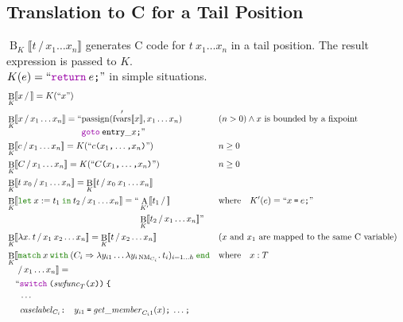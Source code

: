 \documentclass[a4paper,fleqn]{article}
\newcommand{\kwlet}{\mbox{\color{mygreen}\ttfamily let}}
\newcommand{\kwin}{\mbox{\color{mygreen}\ttfamily in}}
\newcommand{\kwmatch}{\mbox{\color{mygreen}\ttfamily match}}
\newcommand{\kwwith}{\mbox{\color{mygreen}\ttfamily with}}
\newcommand{\kwend}{\mbox{\color{mygreen}\ttfamily end}}
\newcommand{\lam}[2]{\lambda #1.\:#2}
\newcommand{\lamB}[1]{\lambda #1.\:}
\newcommand{\letin}[3]{\kwlet\:#1:=#2\:\kwin\:#3}
\newcommand{\match}[4]{\kwmatch\:#1\:\kwwith\:(#2 \Rightarrow #3)_{#4}\:\kwend}
\DeclareMathOperator{\NM}{NM}
\newcommand{\BRA}[1]{\llbracket #1 \rrbracket}
\newcommand{\ldq}{\text{``}}
\newcommand{\rdq}{\text{''}}
\newcommand{\dq}[1]{\text{``}#1\text{''}}
\newcommand{\ttparen}[1]{\texttt{(}#1\texttt{)}}
\newcommand{\ttlbrace}{\texttt{\char '173}}
\newcommand{\tteq}{\texttt{=}}
\newcommand{\ttsemi}{\texttt{;}}
\newcommand{\ttcomma}{\texttt{,}}
\newcommand{\ttcolon}{\texttt{:}}
\newcommand{\kwswitch}{\mbox{\color{myviolet}\ttfamily switch}}
\newcommand{\kwgoto}{\mbox{\color{myviolet}\ttfamily goto}}
\newcommand{\kwCreturn}{\mbox{\color{myviolet}\ttfamily return}}
\DeclareMathOperator{\passign}{passign}
\DeclareMathOperator{\fvarsop}{fvars}
\newcommand{\fvarsd}[1]{\fvarsop'\BRA{#1}}
\DeclareMathOperator{\Aop}{A}
\DeclareMathOperator{\Bop}{B}
\newcommand{\A}[3]{\Aop_{#1}\BRA{#2\,/\,#3}}
\newcommand{\B}[3]{\Bop_{#1}\BRA{#2\,/\,#3}}
\newcommand{\BbreakEq}[3]{\Bop_{#1}\llbracket \begin{aligned}[t] & #2 \\ & /\, #3 \rrbracket = \end{aligned}}
\begin{document}
\subsection{Translation to C for a Tail Position}\label{sec:BK}
\raggedright
$\B{K}{t}{x_1\ldots x_n}$ generates C code for $t\:x_1\ldots x_n$ in a tail position.
The result expression is passed to $K$. \\
$K(e) = \dq{\kwCreturn\:e\ttsemi}$ in simple situations.
\begin{align*}
  &\B{K}{x}{} = K(\dq{x}) \\
  &\B{K}{x}{x_1\ldots x_n} = \begin{aligned}[t] \ldq & {\passign(\fvarsd{x}, x_1\ldots x_n)} \\ & \kwgoto\:\mathtt{entry\_}x\ttsemi \rdq \end{aligned}
    && (n > 0) \wedge \text{$x$ is bounded by a fixpoint} \\
  &\B{K}{c}{x_1\ldots x_n} = K(\dq{c\ttparen{x_1\ttcomma\dotsc\ttcomma x_n}})                                   && n \geq 0 \\
  &\B{K}{C}{x_1\ldots x_n} = K(\dq{C\ttparen{x_1\ttcomma\dotsc\ttcomma x_n}})                                   && n \geq 0 \\
  &\B{K}{t\:x_0}{x_1\ldots x_n} = \B{K}{t}{x_0\:x_1\ldots x_n} \\
  &\B{K}{\letin{x}{t_1}{t_2}}{x_1\ldots x_n} =
      \begin{aligned}[t] \ldq & \A{K'}{t_1}{} \\ & \B{K}{t_2}{x_1\ldots x_n} \rdq \end{aligned}
    && \text{where}\quad K'(e) = \dq{x\:\tteq\:e\ttsemi} \\
  &\B{K}{\lam{x}{t}}{x_1\:x_2\ldots x_n} = \B{K}{t}{x_2\ldots x_n}                                 && \text{($x$ and $x_1$ are mapped to the same C variable)} \\
  &\BbreakEq{K}{\match{x}{C_i}{\lambda y_{i1}\ldots\lamB{y_{i\NM_{C_i}}}t_i}{i=1\ldots h}}{x_1\ldots x_n} && \text{where}\quad x : T \\
     & \quad\begin{alignedat}{2}
       \ldq & \kwswitch\:\ttparen{\mathit{swfunc}_T\ttparen{x}}\:\ttlbrace \\
            & \cdots \\
            & \mathit{caselabel}_{C_i}\ttcolon\quad
              \begin{aligned}[t]
                & y_{i1}\:\tteq\:\mathit{get\_member}_{C_i1}(x)\ttsemi \:\ldots\ttsemi \\

\end{aligned}
\end{alignedat}
\end{align*}
\end{document}
